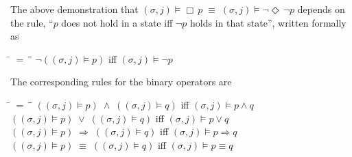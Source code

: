 \documentclass[12pt, fleqn, leqno]{article}
\newcommand{\mymathindent}{24pt}                    %
\newcommand{\equivs}{\ensuremath{\;\equiv\;}}       %
\newcommand{\impl}{\ensuremath{\Rightarrow}}        %
\newcommand{\Event}{\Diamond\,}
\newcommand{\Always}{\Box\,}
\newcommand{\myqedtab}{\hspace{384pt}}              %
\begin{document}
The above demonstration that $(\sigma, j) \models \Always p \equivs (\sigma, j) \models \neg \Event \neg p$ depends on the
rule, ``$p$ does not hold in a state iff $\neg p$ holds in that state'', written formally as
\begin{tabbing}
\hspace{\mymathindent} \= $= \;$ \= \myqedtab \= \kill
  \> $\neg ((\sigma, j) \models p)$ \quad iff \quad $(\sigma, j) \models \neg p$
\end{tabbing}
The corresponding rules for the binary operators are
\begin{tabbing}
\hspace{\mymathindent} \= $= \;$ \= \myqedtab \= \kill
  \> $((\sigma, j) \models p) \;\land\; ((\sigma, j) \models q)$ \quad iff \quad $(\sigma, j) \models p\land q$\\
  \> $((\sigma, j) \models p) \;\lor\; ((\sigma, j) \models q)$ \quad iff \quad $(\sigma, j) \models p\lor q$\\
  \> $((\sigma, j) \models p) \;\impl\; ((\sigma, j) \models q)$ \quad iff \quad $(\sigma, j) \models p \impl q$\\
  \> $((\sigma, j) \models p) \;\equiv\; ((\sigma, j) \models q)$ \quad iff \quad $(\sigma, j) \models p \equiv q$
\end{tabbing}
\end{document}
